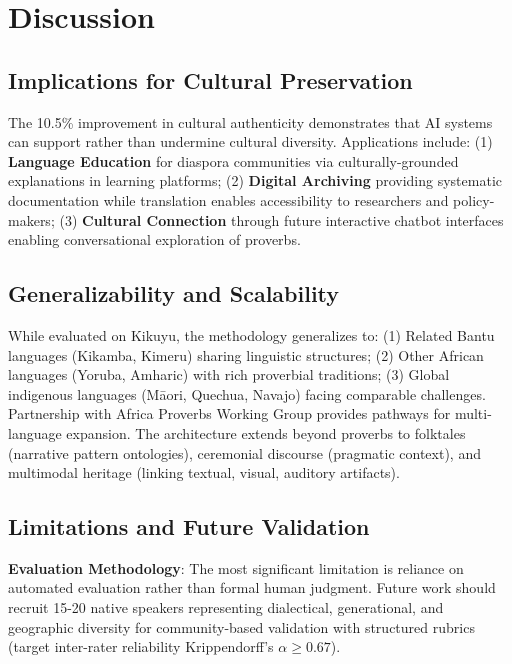 
\section{Discussion}
\label{sec:discussion}

\subsection{Implications for Cultural Preservation}
\label{subsec:cultural_impact}

The 10.5\% improvement in cultural authenticity demonstrates that AI systems can support rather than undermine cultural diversity. Applications include: (1) \textbf{Language Education} for diaspora communities via culturally-grounded explanations in learning platforms; (2) \textbf{Digital Archiving} providing systematic documentation while translation enables accessibility to researchers and policy-makers; (3) \textbf{Cultural Connection} through future interactive chatbot interfaces enabling conversational exploration of proverbs.

\subsection{Generalizability and Scalability}
\label{subsec:generalizability}

While evaluated on Kikuyu, the methodology generalizes to: (1) Related Bantu languages (Kikamba, Kimeru) sharing linguistic structures; (2) Other African languages (Yoruba, Amharic) with rich proverbial traditions; (3) Global indigenous languages (Māori, Quechua, Navajo) facing comparable challenges. Partnership with Africa Proverbs Working Group provides pathways for multi-language expansion. The \ograg{} architecture extends beyond proverbs to folktales (narrative pattern ontologies), ceremonial discourse (pragmatic context), and multimodal heritage (linking textual, visual, auditory artifacts).

\subsection{Limitations and Future Validation}
\label{subsec:limitations}

\textbf{Evaluation Methodology}: The most significant limitation is reliance on automated evaluation rather than formal human judgment. Future work should recruit 15-20 native speakers representing dialectical, generational, and geographic diversity for community-based validation with structured rubrics (target inter-rater reliability Krippendorff's $\alpha \geq 0.67$).

